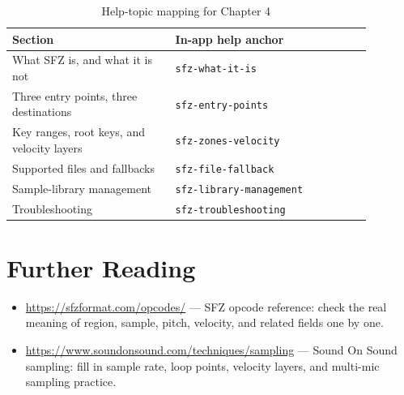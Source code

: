 \begin{table}[htbp]
\centering
\small
\begin{tabular}{@{}p{0.40\linewidth}p{0.48\linewidth}@{}}
\hline
Section & In-app help anchor \\
\hline
What SFZ is, and what it is not & \texttt{sfz-what-it-is} \\
Three entry points, three destinations & \texttt{sfz-entry-points} \\
Key ranges, root keys, and velocity layers & \texttt{sfz-zones-velocity} \\
Supported files and fallbacks & \texttt{sfz-file-fallback} \\
Sample-library management & \texttt{sfz-library-management} \\
Troubleshooting & \texttt{sfz-troubleshooting} \\
\hline
\end{tabular}
\caption{Help-topic mapping for Chapter 4}
\end{table}

\section*{Further Reading}
\begin{itemize}[leftmargin=1.5em]
\item \url{https://sfzformat.com/opcodes/} — SFZ opcode reference: check the real meaning of region, sample, pitch, velocity, and related fields one by one.
\item \url{https://www.soundonsound.com/techniques/sampling} — Sound On Sound sampling: fill in sample rate, loop points, velocity layers, and multi-mic sampling practice.
\end{itemize}
